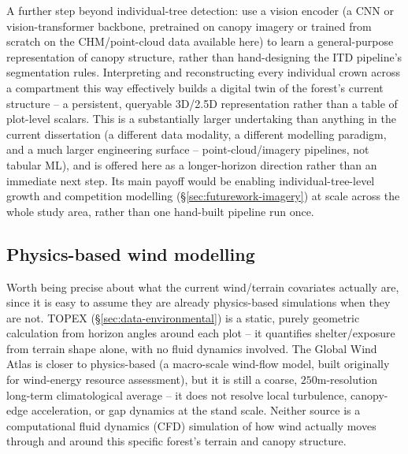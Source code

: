 A further step beyond individual-tree detection: use a vision encoder (a CNN or vision-transformer
backbone, pretrained on canopy imagery or trained from scratch on the CHM/point-cloud data
available here) to learn a general-purpose representation of canopy structure, rather than
hand-designing the ITD pipeline's segmentation rules. Interpreting and reconstructing every
individual crown across a compartment this way effectively builds a digital twin of the forest's
current structure -- a persistent, queryable 3D/2.5D representation rather than a table of
plot-level scalars. This is a substantially larger undertaking than anything in the current
dissertation (a different data modality, a different modelling paradigm, and a much larger
engineering surface -- point-cloud/imagery pipelines, not tabular ML), and is offered here as a
longer-horizon direction rather than an immediate next step. Its main payoff would be enabling
individual-tree-level growth and competition modelling (\S\ref{sec:futurework-imagery}) at scale
across the whole study area, rather than one hand-built pipeline run once.

\subsection{Physics-based wind modelling}
\label{sec:futurework-wind-cfd}

Worth being precise about what the current wind/terrain covariates actually are, since it is easy
to assume they are already physics-based simulations when they are not. TOPEX
(\S\ref{sec:data-environmental}) is a static, purely geometric calculation from horizon angles
around each plot -- it quantifies shelter/exposure from terrain shape alone, with no fluid dynamics
involved. The Global Wind Atlas is closer to physics-based (a macro-scale wind-flow model, built
originally for wind-energy resource assessment), but it is still a coarse, $250\text{m}$-resolution
long-term climatological average -- it does not resolve local turbulence, canopy-edge acceleration,
or gap dynamics at the stand scale. Neither source is a computational fluid dynamics (CFD)
simulation of how wind actually moves through and around this specific forest's terrain and canopy
structure.

